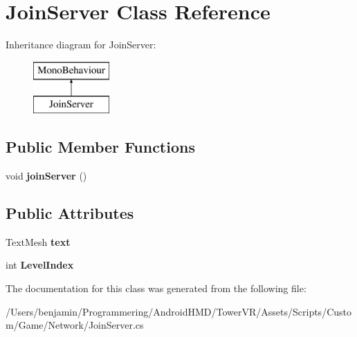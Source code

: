 \hypertarget{class_join_server}{}\section{Join\+Server Class Reference}
\label{class_join_server}
Inheritance diagram for Join\+Server\+:\begin{figure}[H]
\begin{center}
\leavevmode
\includegraphics[height=2.000000cm]{class_join_server}
\end{center}
\end{figure}
\subsection*{Public Member Functions}
\begin{DoxyCompactItemize}
\item 
void {\bfseries join\+Server} ()\hypertarget{class_join_server_a20d8990c5457536a20f14a53f327d3c9}{}\label{class_join_server_a20d8990c5457536a20f14a53f327d3c9}

\end{DoxyCompactItemize}
\subsection*{Public Attributes}
\begin{DoxyCompactItemize}
\item 
Text\+Mesh {\bfseries text}\hypertarget{class_join_server_aba960f7e76054c4ebaf1e5c6243a86a9}{}\label{class_join_server_aba960f7e76054c4ebaf1e5c6243a86a9}

\item 
int {\bfseries Level\+Index}\hypertarget{class_join_server_ae9bc9f5b85b97db6f4a061fe47951dac}{}\label{class_join_server_ae9bc9f5b85b97db6f4a061fe47951dac}

\end{DoxyCompactItemize}


The documentation for this class was generated from the following file\+:\begin{DoxyCompactItemize}
\item 
/\+Users/benjamin/\+Programmering/\+Android\+H\+M\+D/\+Tower\+V\+R/\+Assets/\+Scripts/\+Custom/\+Game/\+Network/Join\+Server.\+cs\end{DoxyCompactItemize}
